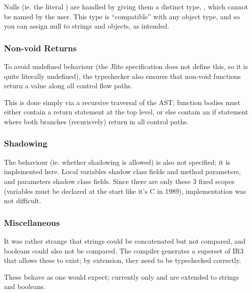 \documentclass[12pt]{article}
\begin{document}
Nulls (ie. the literal ) are handled by giving them a distinct type, , which cannot
be named by the user. This type is \enquote{compatible} with any object type, and so you can assign null to
strings and objects, as intended.




\subsubsection{Non-void Returns}

To avoid undefined behaviour (the Jlite specification does not define this, so it is quite literally undefined), the
typechecker also ensures that non-void functions return a value along all control flow paths.

This is done simply via a recursive traversal of the AST; function bodies must either contain a return statement
at the top level, or else contain an if statement where both branches (recurisvely) return in all control paths.



\subsubsection{Shadowing}

The behaviour (ie. whether shadowing is allowed) is also not specified; it is implemented here. Local variables shadow
class fields and method parameters, and parameters shadow class fields. Since there are only these 3 fixed scopes (variables
must be declared at the start like it's C in 1989), implementation was not difficult.



\subsubsection{Miscellaneous}

It was rather strange that strings could be concatenated but not compared, and booleans could also not be compared. The
compiler generates a superset of IR3 that allows these to exist; by extension, they need to be typechecked correctly.

These behave as one would expect; currently only \eqtt{==} and \eqtt{!=} are extended to strings and booleans.

\end{document}
